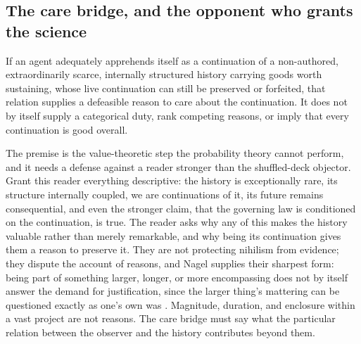 \subsection*{The care bridge, and the opponent who grants the science}

\begin{premise}\label{prem:care}
If an agent adequately apprehends itself as a continuation of a
non-authored, extraordinarily scarce, internally structured history
carrying goods worth sustaining, whose live continuation can still be
preserved or forfeited, that relation supplies a defeasible reason to care
about the continuation. It does not by itself supply a categorical duty,
rank competing reasons, or imply that every continuation is good overall.
\end{premise}

\noindent The premise is the value-theoretic step the probability theory
cannot perform, and it needs a defense against a reader stronger than the
shuffled-deck objector. Grant this reader everything descriptive: the history
is exceptionally rare, its structure internally coupled, we are continuations
of it, its future remains consequential, and even the stronger claim, that
the governing law is conditioned on the continuation, is true. The reader
asks why any of this makes the history valuable rather than merely
remarkable, and why being its continuation gives them a reason to preserve
it. They are not protecting nihilism from evidence; they dispute the account
of reasons, and Nagel supplies their sharpest form: being part of something
larger, longer, or more encompassing does not by itself answer the demand for
justification, since the larger thing's mattering can be questioned exactly as
one's own was \cite{Nagel71}. Magnitude, duration, and enclosure within a
vast project are not reasons. The care bridge must say what the particular
relation between the observer and the history contributes beyond them.

